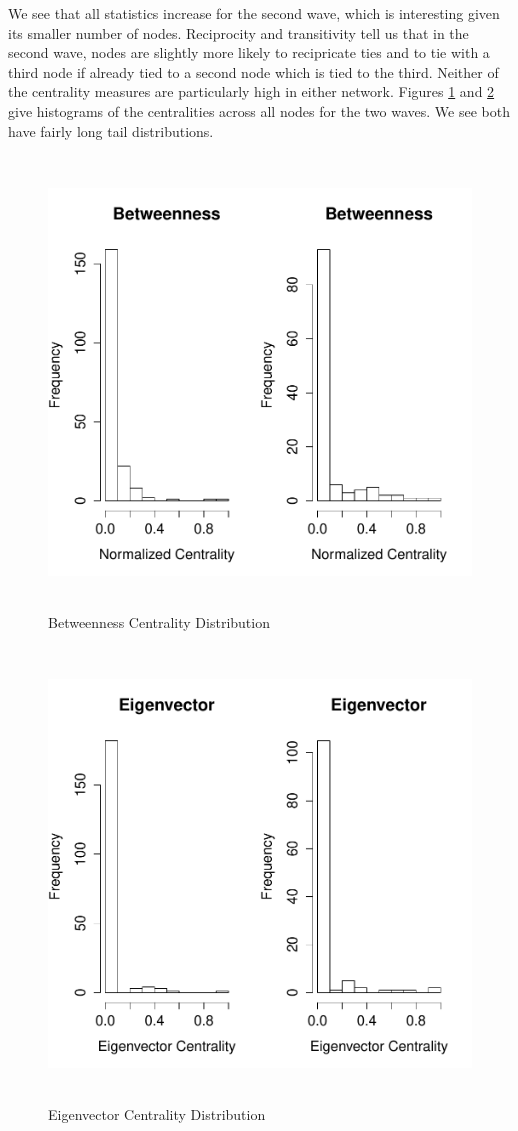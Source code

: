 \documentclass[12pt]{article} %
\numberwithin{equation}{section}		%
\numberwithin{figure}{section}			%
\numberwithin{table}{section}				%
\begin{document}
We see that all statistics increase for the second wave, which is interesting given its smaller number of nodes. Reciprocity and transitivity tell us that in the second wave, nodes are slightly more likely to recipricate ties and to tie with a third node if already tied to a second node which is tied to the third. Neither of the centrality measures are particularly high in either network. Figures \ref{fig:x3} and \ref{fig:x4} give histograms of the centralities across all nodes for the two waves. We see both have fairly long tail distributions.

\begin{figure}[!ht]
      \includegraphics[width=16cm, height = 12cm]{betweennessPlot.pdf}
      \caption{Betweenness Centrality Distribution}\label{fig:x3}
\end{figure}

\begin{figure}[!ht]
      \includegraphics[width=16cm, height = 12cm]{eigenvectorPlot.pdf}
      \caption{Eigenvector Centrality Distribution}\label{fig:x4}
\end{figure}
\end{document}
